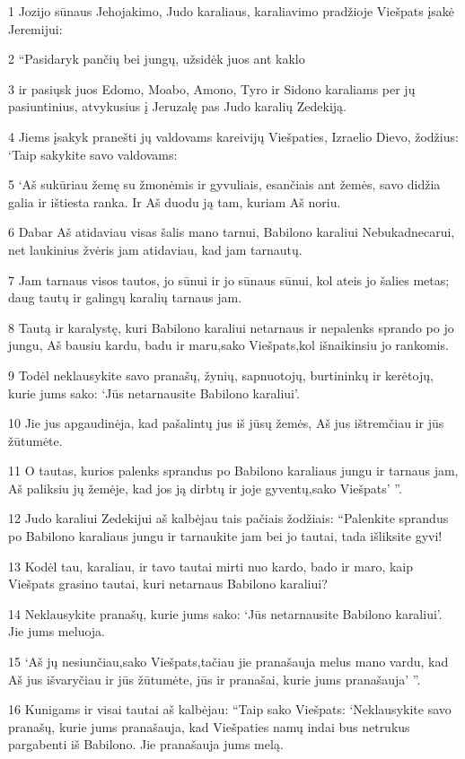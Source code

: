 \par 1 Jozijo sūnaus Jehojakimo, Judo karaliaus, karaliavimo pradžioje Viešpats įsakė Jeremijui: 
\par 2 “Pasidaryk pančių bei jungų, užsidėk juos ant kaklo 
\par 3 ir pasiųsk juos Edomo, Moabo, Amono, Tyro ir Sidono karaliams per jų pasiuntinius, atvykusius į Jeruzalę pas Judo karalių Zedekiją. 
\par 4 Jiems įsakyk pranešti jų valdovams kareivijų Viešpaties, Izraelio Dievo, žodžius: ‘Taip sakykite savo valdovams: 
\par 5 ‘Aš sukūriau žemę su žmonėmis ir gyvuliais, esančiais ant žemės, savo didžia galia ir ištiesta ranka. Ir Aš duodu ją tam, kuriam Aš noriu. 
\par 6 Dabar Aš atidaviau visas šalis mano tarnui, Babilono karaliui Nebukadnecarui, net laukinius žvėris jam atidaviau, kad jam tarnautų. 
\par 7 Jam tarnaus visos tautos, jo sūnui ir jo sūnaus sūnui, kol ateis jo šalies metas; daug tautų ir galingų karalių tarnaus jam. 
\par 8 Tautą ir karalystę, kuri Babilono karaliui netarnaus ir nepalenks sprando po jo jungu, Aš bausiu kardu, badu ir maru,­sako Viešpats,­kol išnaikinsiu jo rankomis. 
\par 9 Todėl neklausykite savo pranašų, žynių, sapnuotojų, burtininkų ir kerėtojų, kurie jums sako: ‘Jūs netarnausite Babilono karaliui’. 
\par 10 Jie jus apgaudinėja, kad pašalintų jus iš jūsų žemės, Aš jus ištremčiau ir jūs žūtumėte. 
\par 11 O tautas, kurios palenks sprandus po Babilono karaliaus jungu ir tarnaus jam, Aš paliksiu jų žemėje, kad jos ją dirbtų ir joje gyventų,­sako Viešpats’ ”. 
\par 12 Judo karaliui Zedekijui aš kalbėjau tais pačiais žodžiais: “Palenkite sprandus po Babilono karaliaus jungu ir tarnaukite jam bei jo tautai, tada išliksite gyvi! 
\par 13 Kodėl tau, karaliau, ir tavo tautai mirti nuo kardo, bado ir maro, kaip Viešpats grasino tautai, kuri netarnaus Babilono karaliui? 
\par 14 Neklausykite pranašų, kurie jums sako: ‘Jūs netarnausite Babilono karaliui’. Jie jums meluoja. 
\par 15 ‘Aš jų nesiunčiau,­sako Viešpats,­tačiau jie pranašauja melus mano vardu, kad Aš jus išvaryčiau ir jūs žūtumėte, jūs ir pranašai, kurie jums pranašauja’ ”. 
\par 16 Kunigams ir visai tautai aš kalbėjau: “Taip sako Viešpats: ‘Neklausykite savo pranašų, kurie jums pranašauja, kad Viešpaties namų indai bus netrukus pargabenti iš Babilono. Jie pranašauja jums melą. 
